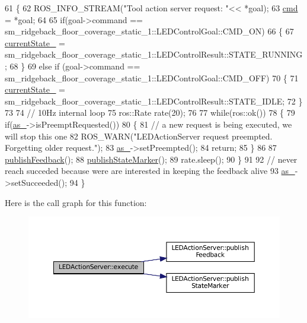 \begin{DoxyCode}
61 \{
62   ROS\_INFO\_STREAM(\textcolor{stringliteral}{"Tool action server request: "}<< *goal);
63   \hyperlink{classLEDActionServer_a4d3a4c07e7659cdd78228932bb1634d3}{cmd} = *goal;
64 
65   \textcolor{keywordflow}{if}(goal->command == sm\_ridgeback\_floor\_coverage\_static\_1::LEDControlGoal::CMD\_ON)
66   \{
67     \hyperlink{classLEDActionServer_a1dc456e987dc331501ad6ff2215661ff}{currentState\_} =  sm\_ridgeback\_floor\_coverage\_static\_1::LEDControlResult::STATE\_RUNNING;
68   \}
69   \textcolor{keywordflow}{else}  \textcolor{keywordflow}{if} (goal->command == sm\_ridgeback\_floor\_coverage\_static\_1::LEDControlGoal::CMD\_OFF)
70   \{
71     \hyperlink{classLEDActionServer_a1dc456e987dc331501ad6ff2215661ff}{currentState\_} =  sm\_ridgeback\_floor\_coverage\_static\_1::LEDControlResult::STATE\_IDLE;
72   \}
73 
74   \textcolor{comment}{// 10Hz internal loop}
75   ros::Rate rate(20);
76 
77   \textcolor{keywordflow}{while}(ros::ok())
78   \{
79     \textcolor{keywordflow}{if}(\hyperlink{classLEDActionServer_a61d21c77642081acf017d4ebd65b2de0}{as\_}->isPreemptRequested())
80     \{
81        \textcolor{comment}{// a new request is being executed, we will stop this one}
82        ROS\_WARN(\textcolor{stringliteral}{"LEDActionServer request preempted. Forgetting older request."});
83        \hyperlink{classLEDActionServer_a61d21c77642081acf017d4ebd65b2de0}{as\_}->setPreempted(); 
84        \textcolor{keywordflow}{return};
85     \}
86     
87     \hyperlink{classLEDActionServer_a25c93d4e7ecdacbb4f5b090d7789aa36}{publishFeedback}();
88     \hyperlink{classLEDActionServer_a73bb754ac2347c50660624ad92315895}{publishStateMarker}();
89     rate.sleep();
90   \}
91 
92    \textcolor{comment}{// never reach succeded because were are interested in keeping the feedback alive}
93    \hyperlink{classLEDActionServer_a61d21c77642081acf017d4ebd65b2de0}{as\_}->setSucceeded();
94 \}
\end{DoxyCode}
Here is the call graph for this function\+:
\nopagebreak
\begin{figure}[H]
\begin{center}
\leavevmode
\includegraphics[width=350pt]{classLEDActionServer_adf0a5d17104919195a605c89ee488af1_cgraph}
\end{center}
\end{figure}
\mbox{\label{classLEDActionServer_ae7cf81f53d16e3bdb5142df60b2017b3}} 
